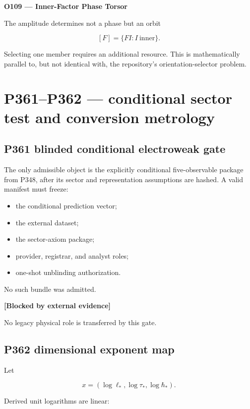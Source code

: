 \documentclass[11pt,a4paper,openany]{report}
\begin{document}
\textbf{O109 --- Inner-Factor Phase Torsor}

The amplitude determines not a phase but an orbit

\[
[F]=\{F I:I\ \text{inner}\}.
\]

Selecting one member requires an additional resource. This is mathematically parallel to, but not identical with, the repository's orientation-selector problem.

\chapter{P361--P362 --- conditional sector test and conversion metrology}

\section{P361 blinded conditional electroweak gate}

The only admissible object is the explicitly conditional five-observable package from P348, after its sector and representation assumptions are hashed. A valid manifest must freeze:

\begin{itemize}
\item 
the conditional prediction vector;

\item 
the external dataset;

\item 
the sector-axiom package;

\item 
provider, registrar, and analyst roles;

\item 
one-shot unblinding authorization.

\end{itemize}

No such bundle was admitted.

\textbf{[Blocked by external evidence]}

No legacy physical role is transferred by this gate.

\section{P362 dimensional exponent map}

Let

\[
x=(\log\ell_*,\log\tau_*,\log\hbar_*).
\]

Derived unit logarithms are linear:
\end{document}
